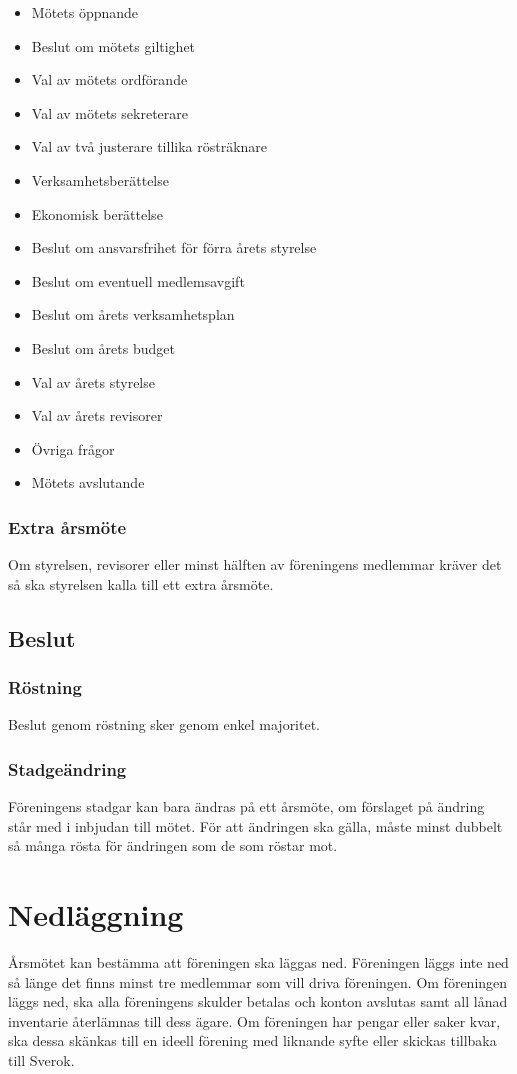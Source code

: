 \documentclass[11pt, noincludeaddress]{classes/cthit}
\begin{document}
\begin{itemize}
        \item Mötets öppnande
        \item Beslut om mötets giltighet
        \item Val av mötets ordförande
        \item Val av mötets sekreterare
        \item Val av två justerare tillika rösträknare
        \item Verksamhetsberättelse
        \item Ekonomisk berättelse
        \item Beslut om ansvarsfrihet för förra årets styrelse
        \item Beslut om eventuell medlemsavgift
        \item Beslut om årets verksamhetsplan
        \item Beslut om årets budget
        \item Val av årets styrelse
        \item Val av årets revisorer
        \item Övriga frågor
        \item Mötets avslutande
\end{itemize}

\subsubsection{Extra årsmöte}
Om styrelsen, revisorer eller minst hälften av föreningens medlemmar kräver det så ska styrelsen kalla till ett extra årsmöte.

\subsection{Beslut}

\subsubsection{Röstning}
Beslut genom röstning sker genom enkel majoritet.

\subsubsection{Stadgeändring}
Föreningens stadgar kan bara ändras på ett årsmöte, om förslaget på ändring står med i inbjudan till mötet. För att ändringen ska gälla, måste minst dubbelt så många rösta för ändringen som de som röstar mot.

\section{Nedläggning}
Årsmötet kan bestämma att föreningen ska läggas ned. Föreningen läggs inte ned så länge det finns minst tre medlemmar som vill driva föreningen.
Om föreningen läggs ned, ska alla föreningens skulder betalas och konton avslutas samt all lånad inventarie återlämnas till dess ägare.
Om föreningen har pengar eller saker kvar, ska dessa skänkas till en ideell förening med liknande syfte eller skickas tillbaka till Sverok.
\end{document}
